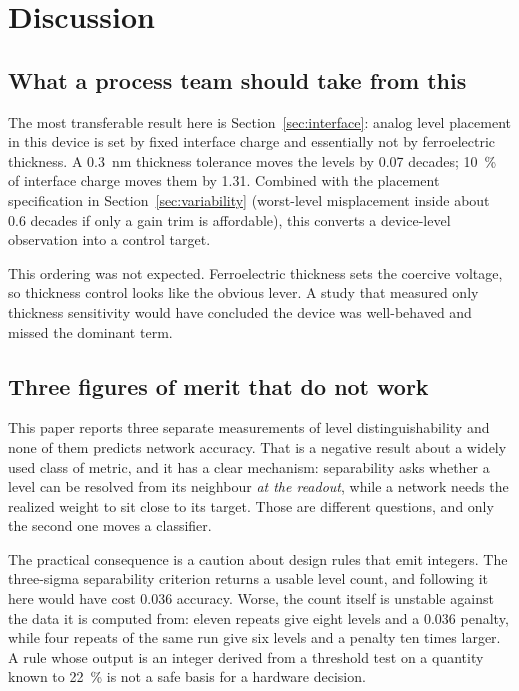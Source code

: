 \section{Discussion}
\label{sec:discussion}

\subsection{What a process team should take from this}

The most transferable result here is Section~\ref{sec:interface}: analog level placement in
this device is set by fixed interface charge and essentially not by ferroelectric
thickness. A \SI{0.3}{\nano\metre} thickness tolerance moves the levels by \num{0.07}
decades; \SI{10}{\percent} of interface charge moves them by \num{1.31}. Combined with the
placement specification in Section~\ref{sec:variability} (worst-level misplacement inside
about \num{0.6} decades if only a gain trim is affordable), this converts a device-level
observation into a control target.

This ordering was not expected. Ferroelectric thickness sets the coercive voltage, so
thickness control looks like the obvious lever. A study that measured only thickness
sensitivity would have concluded the device was well-behaved and missed the dominant term.

\subsection{Three figures of merit that do not work}

This paper reports three separate measurements of level distinguishability and none of them
predicts network accuracy. That is a negative result about a widely used class of metric,
and it has a clear mechanism: separability asks whether a level can be resolved from its
neighbour \emph{at the readout}, while a network needs the realized weight to sit close to
its target. Those are different questions, and only the second one moves a classifier.

The practical consequence is a caution about design rules that emit integers. The
three-sigma separability criterion returns a usable level count, and following it here
would have cost \num{0.036} accuracy. Worse, the count itself is unstable against the data
it is computed from: eleven repeats give eight levels and a \num{0.036} penalty, while four
repeats of the same run give six levels and a penalty ten times larger. A rule whose output
is an integer derived from a threshold test on a quantity known to \SI{22}{\percent} is not
a safe basis for a hardware decision.

